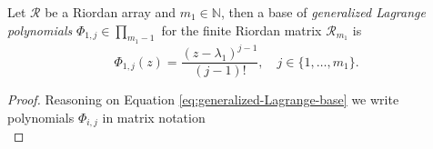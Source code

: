 \begin{lemma}
Let $\mathcal{R}$ be a Riordan array and $m_{1}\in\mathbb{N}$, then a base of \textit{generalized
Lagrange polynomials} $\Phi_{1,j}\in\prod_{m_1-1}$ for the finite Riordan matrix $\mathcal{R}_{m_{1}}$ is
\begin{equation}
  \label{eq:generalized-Lagrange-polynomials-RA}
  \Phi_{1,j}(z) = \frac{\left(z-\lambda_{1}\right)^{j-1}}{(j-1)!}, 
  \quad j\in \lbrace 1,\ldots, m_{1} \rbrace.
\end{equation}
\end{lemma}

\begin{proof}
Reasoning on Equation \ref{eq:generalized-Lagrange-base} we write polynomials
$\Phi_{i,j}$ in matrix notation
\begin{equation}
\label{eq:Ez-product}

\end{equation}
\end{proof}
